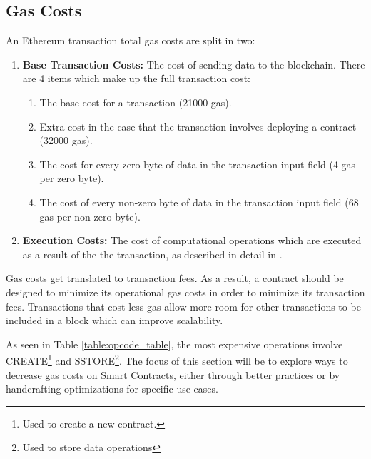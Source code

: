 \subsection{Gas Costs} \label{gas-costs}
An Ethereum transaction total gas costs are split in two: %
\begin{enumerate}
    \item \textbf{Base Transaction Costs:} The cost of sending data to the blockchain. There are 4 items which make up the full transaction cost:
        \begin{enumerate}
            \item The base cost for a transaction (21000 gas). %
            \item Extra cost in the case that the transaction involves deploying a contract (32000 gas).
            \item The cost for every zero byte of data in the transaction input field (4 gas per zero byte).
            \item The cost of every non-zero byte of data in the transaction input field (68 gas per non-zero byte).
        \end{enumerate}
    \item \textbf{Execution Costs:} The cost of computational operations which are executed as a result of the the transaction, as described in detail in \cite{ethereum, gas}.
\end{enumerate} 

Gas costs get translated to transaction fees. As a result, a contract should be designed to minimize its operational gas costs in order to minimize its transaction fees. Transactions that cost less gas allow more room for other transactions to be included in a block which can improve scalability. %




As seen in Table \ref{table:opcode_table}, the most expensive operations involve CREATE\footnote{Used to create a new contract.} and SSTORE\footnote{Used to store data operations}. The focus of this section will be to explore ways to decrease gas costs on Smart Contracts, either through better practices or by handcrafting optimizations for specific use cases.

